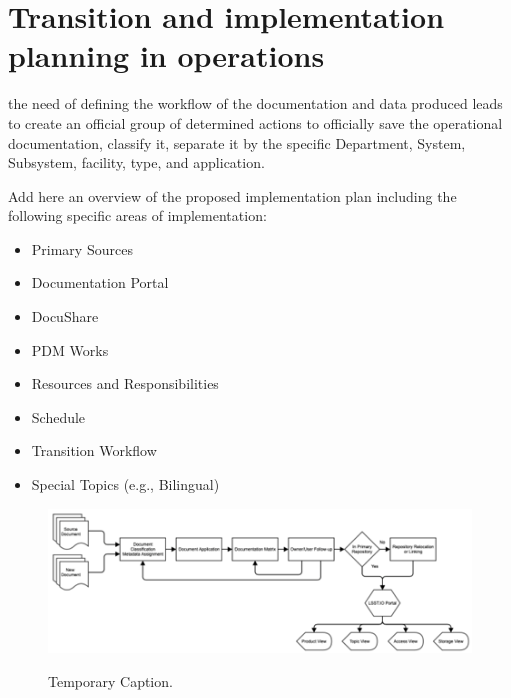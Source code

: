 \section{Transition and implementation planning in operations}
\label{sec:implementation}

the need of defining the workflow of the documentation and data produced leads to create an official group of determined actions to officially save the operational documentation, classify it, separate it by the specific Department, System, Subsystem, facility, type, and application. 

Add here an overview of the proposed implementation plan including the following specific areas of implementation:

\begin{itemize}

\item Primary Sources
\item Documentation Portal
\item DocuShare
\item PDM Works
\item Resources and Responsibilities
\item Schedule
\item Transition Workflow
\item Special Topics (e.g., Bilingual)

\end{itemize}

\begin{figure}[t]
\caption{Temporary Caption.}
\centering
\includegraphics[width=\textwidth]{operations-documentation-workflow-temp}
\label{fig:operations-documentation-workflow}
\end{figure}
